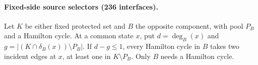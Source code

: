 \paragraph{Fixed-side source selectors (236 interfaces).}
Let $K$ be either fixed protected set and $B$ the opposite component,
with pool $P_B$ and a Hamilton cycle. At a common state $x$, put
$d=\deg_B(x)$ and $g=|(K\cap\delta_B(x))\setminus P_B|$.
If $d-g\le1$, every Hamilton cycle in $B$ takes two incident edges
at $x$, at least one in $K\setminus P_B$. Only $B$ needs a Hamilton cycle.
